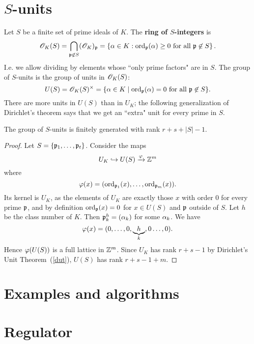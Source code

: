 \section{$S$-units}
\begin{df}
Let $S$ be a finite set of prime ideals of $K$. The \textbf{ring of $S$-integers} is
\[
\mathscr{O}_K(S)=\bigcap_{\mathfrak{p}\not\in S}(\mathscr{O}_K)_{\mathfrak{p}}=\left\{{\alpha \in K}:{\operatorname{ord}_{\mathfrak{p}}(\alpha)\ge 0 \text{ for all }\mathfrak{p}\not\in S}\right\}.
\]
I.e. we allow dividing by elements whose ``only prime factors" are in $S$. 
The group of $S$-units is the group of units in $\mathscr{O}_K(S)$:
\[
U(S)=\mathscr{O}_K(S)^{\times} =\{\alpha\in K\mid \operatorname{ord}_{\mathfrak{p}}(\alpha)=0\text{ for all }\mathfrak{p}\not\in S\}.
\]
There are more units in $U(S)$ than in $U_K$; the following generalization of Dirichlet's theorem says that we get an ``extra" unit for every prime in $S$.
\end{df}
\begin{thm}
The group of $S$-units is finitely generated with rank $r+s+|S| -1$.
\end{thm}
\begin{proof}
Let $S=\{\mathfrak{p}_1,\ldots, \mathfrak{p}_t\}$. 
Consider the maps
\[
U_K\hookrightarrow U(S)\xrightarrow{\varphi} \mathbb{Z}^m
\]
where 
\[
\varphi(x)=(\operatorname{ord}_{\mathfrak{p}_1}(x),\ldots, \operatorname{ord}_{\mathfrak{p}_m}(x)).
\]
Its kernel is $U_K$, as the elements of $U_K$ are exactly those $x$ with order 0 for every prime $\mathfrak{p}$, and by definition $\operatorname{ord}_{\mathfrak{p}}(x)=0$ for $x\in U(S)$ and $\mathfrak{p}$ outside of $S$. Let $h$ be the class number of $K$. Then $\mathfrak{p}_k^h=(\alpha_k)$ for some $\alpha_k$. We have
\[
\varphi(x)=(0,\ldots, 0,\underbrace{h}_k,0\ldots, 0).
\]
Hence $\varphi(U(S))$ is a full lattice in $\mathbb{Z}^m$. Since $U_K$ has rank $r+s-1$ by Dirichlet's Unit Theorem~(\ref{dut}), $U(S)$ has rank $r+s-1+m$.
\end{proof}
\section{Examples and algorithms}
\section{Regulator}